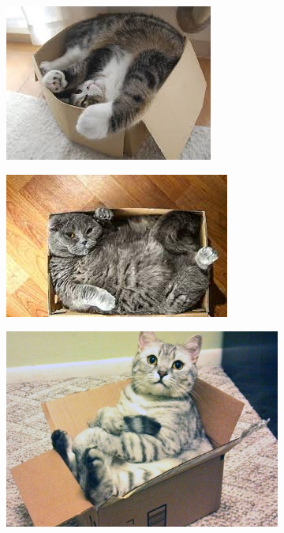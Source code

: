 \documentclass[11pt]{article}
\begin{document}
\begin{figure}[H]
	\centering
	\begin{subfigure}[b]{0.32\textwidth}
	\includegraphics[width=\textwidth]{images/cat-in-the-box-1.jpg}
	\end{subfigure}
	\hfill
	\begin{subfigure}[b]{0.32\textwidth}
	\includegraphics[width=\textwidth]{images/cat-in-the-box-3.jpg}
	\end{subfigure}
	\hfill
	\begin{subfigure}[b]{0.32\textwidth}
	\includegraphics[width=\textwidth]{images/cat-in-the-box-4.jpg}

\end{subfigure}
\end{figure}
\end{document}
